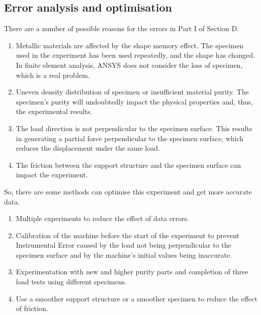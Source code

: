 \subsection{Error analysis and optimisation}
There are a number of possible reasons for the errors in Part I of Section D.
\begin{enumerate}
	\item Metallic materials are affected by the shape memory effect. The specimen used in the experiment has been used repeatedly, and the shape has changed. In finite element analysis, ANSYS does not consider the loss of specimen, which is a real problem.
	\item Uneven density distribution of specimen or insufficient material purity. The specimen's purity will undoubtedly impact the physical properties and, thus, the experimental results.
	\item The load direction is not perpendicular to the specimen surface. This results in generating a partial force perpendicular to the specimen surface, which reduces the displacement under the same load.
	\item The friction between the support structure and the specimen surface can impact the experiment.\cite{ref1}
\end{enumerate}

So, there are some methods can optimise this experiment and get more accurate data.
\begin{enumerate}
	\item Multiple experiments to reduce the effect of data errors.
	\item Calibration of the machine before the start of the experiment to prevent Instrumental Error caused by the load not being perpendicular to the specimen surface and by the machine's initial values being inaccurate.
	\item Experimentation with new and higher purity parts and completion of three load tests using different specimens.
	\item Use a smoother support structure or a smoother specimen to reduce the effect of friction.\cite{ref1}
\end{enumerate}
\label{sec:conclusion}
